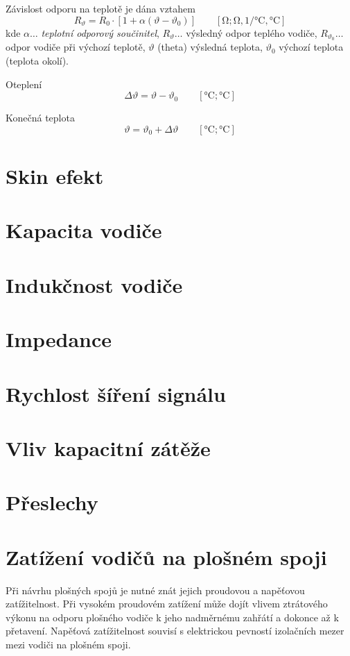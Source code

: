   Závislost odporu na teplotě je dána vztahem \cite[s.~24]{Necasek1972} 
  \begin{equation}\label{ape:eq002}
    R_\vartheta = R_0\cdot[1+\alpha(\vartheta - \vartheta_0)] \qquad[\unit{\ohm};\unit{\ohm}, 
    \unit{1\per\degreeCelsius}, \unit{\degreeCelsius}]
  \end{equation}
  kde \(\alpha\ldots\) \emph{teplotní odporový součinitel}, \(R_\vartheta\ldots\) výsledný odpor 
  teplého vodiče,  \(R_{\vartheta_0}\ldots\) odpor vodiče při výchozí teplotě, \(\vartheta\) 
  (theta) výsledná teplota, \(\vartheta_0\) výchozí teplota (teplota okolí).
  
  Oteplení 
  \begin{equation}\label{ape:eq003}
    \Delta\vartheta = \vartheta - \vartheta_0 \qquad[\unit{\degreeCelsius}; \unit{\degreeCelsius}]
  \end{equation}
  
  Konečná teplota
  \begin{equation}\label{ape:eq004}
    \vartheta = \vartheta_0 + \Delta\vartheta \qquad[\unit{\degreeCelsius}; \unit{\degreeCelsius}]
  \end{equation}

\section{Skin efekt}
\section{Kapacita vodiče}
\section{Indukčnost vodiče}
\section{Impedance}
\section{Rychlost šíření signálu}
\section{Vliv kapacitní zátěže}
\section{Přeslechy}

\section{Zatížení vodičů na plošném spoji}
  Při návrhu plošných spojů je nutné znát jejich proudovou a napěťovou zatížitelnost. Při
  vysokém proudovém zatížení může dojít vlivem ztrátového výkonu na odporu plošného
  vodiče k jeho nadměrnému zahřátí a dokonce až k přetavení. Napěťová zatížitelnost souvisí
  s elektrickou pevností izolačních mezer mezi vodiči na plošném spoji.
  
